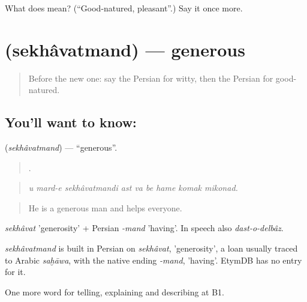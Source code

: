 \begin{tcolorbox}[breakable,colback=teal!4,colframe=teal!35!black,title={Before you move on}]
What does   mean? (\textquotedblleft{}Good-natured, pleasant\textquotedblright{}.) Say it once more.
\end{tcolorbox}
\section[\texorpdfstring{\fa{سخاوتمند} (sekhâvatmand)}{سخاوتمند (sekhâvatmand)}]{ (sekhâvatmand) — generous}

\label{lesson:FA-C488-sekhavatmand}



\begin{quote}
Before the new one: say the Persian for witty, then the Persian for good-natured.
\end{quote}

\subsection*{You'll want to know: }
\textbf{} (\emph{sekhâvatmand}) — \textquotedblleft{}generous\textquotedblright{}.

\begin{quote}
        .
\end{quote}

\begin{quote}
\emph{u mard-e sekhâvatmandi ast va be hame komak mikonad.}
\end{quote}

\begin{quote}
He is a generous man and helps everyone.
\end{quote}

\emph{sekhâvat} 'generosity' + Persian \emph{-mand} 'having'. In speech also \emph{dast-o-delbâz}.

\begin{cousinweb}
\emph{sekhâvatmand} is built in Persian on \emph{sekhâvat}, 'generosity', a loan usually traced to Arabic \emph{saḫāwa}, with the native ending \emph{-mand}, 'having'. EtymDB has no entry for it.
\end{cousinweb}

\begin{grammarlens}[title={What you've built}]
One more word for telling, explaining and describing at B1.
\end{grammarlens}

